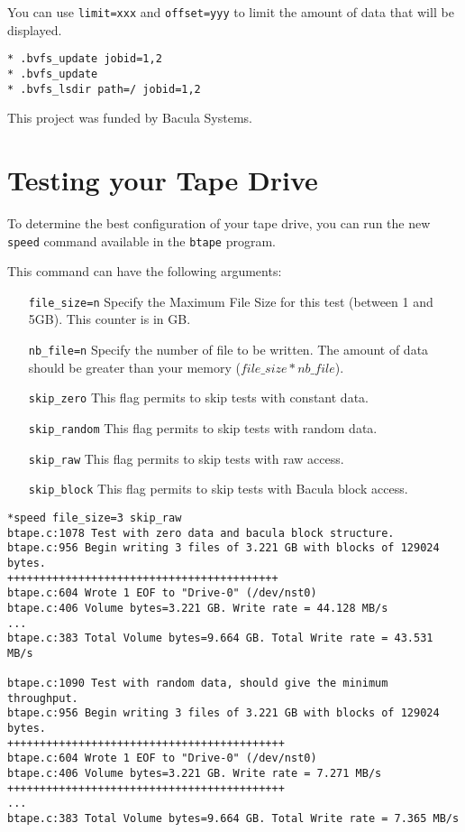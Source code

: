 You can use \texttt{limit=xxx} and \texttt{offset=yyy} to limit the amount of
data that will be displayed.

\begin{verbatim}
* .bvfs_update jobid=1,2
* .bvfs_update
* .bvfs_lsdir path=/ jobid=1,2
\end{verbatim}

This project was funded by Bacula Systems.

\section{Testing your Tape Drive}
\label{sec:btapespeed}

To determine the best configuration of your tape drive, you can run the new
\texttt{speed} command available in the \texttt{btape} program.

This command can have the following arguments:
\begin{itemize}
\item[\texttt{file\_size=n}] Specify the Maximum File Size for this test
  (between 1 and 5GB). This counter is in GB.
\item[\texttt{nb\_file=n}] Specify the number of file to be written. The amount
  of data should be greater than your memory ($file\_size*nb\_file$).
\item[\texttt{skip\_zero}] This flag permits to skip tests with constant
  data.
\item[\texttt{skip\_random}] This flag permits to skip tests with random
  data.
\item[\texttt{skip\_raw}] This flag permits to skip tests with raw access.
\item[\texttt{skip\_block}] This flag permits to skip tests with Bacula block
  access.
\end{itemize}

\begin{verbatim}
*speed file_size=3 skip_raw
btape.c:1078 Test with zero data and bacula block structure.
btape.c:956 Begin writing 3 files of 3.221 GB with blocks of 129024 bytes.
++++++++++++++++++++++++++++++++++++++++++
btape.c:604 Wrote 1 EOF to "Drive-0" (/dev/nst0)
btape.c:406 Volume bytes=3.221 GB. Write rate = 44.128 MB/s
...
btape.c:383 Total Volume bytes=9.664 GB. Total Write rate = 43.531 MB/s

btape.c:1090 Test with random data, should give the minimum throughput.
btape.c:956 Begin writing 3 files of 3.221 GB with blocks of 129024 bytes.
+++++++++++++++++++++++++++++++++++++++++++
btape.c:604 Wrote 1 EOF to "Drive-0" (/dev/nst0)
btape.c:406 Volume bytes=3.221 GB. Write rate = 7.271 MB/s
+++++++++++++++++++++++++++++++++++++++++++
...
btape.c:383 Total Volume bytes=9.664 GB. Total Write rate = 7.365 MB/s

\end{verbatim}

